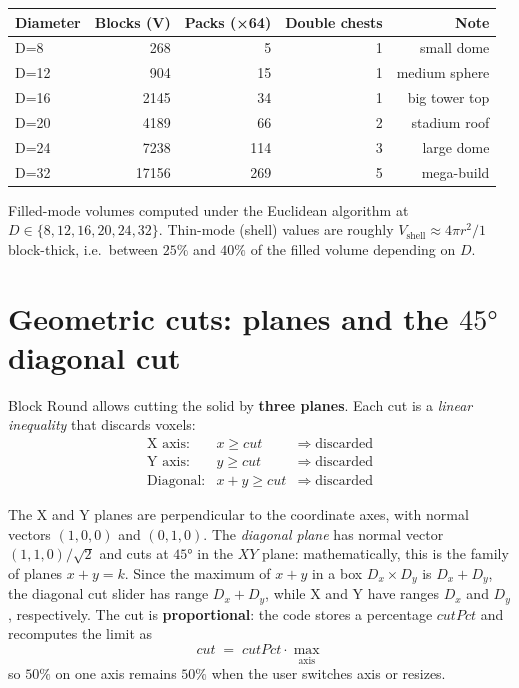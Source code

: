 \documentclass[12pt,a4paper]{scrartcl}
\newcommand{\acc}[1]{\textcolor{accent}{\textbf{#1}}}
\begin{document}
\vspace{0.5em}
\begin{center}
\begin{tabular}{@{}lrrrr@{}}
\toprule
\textbf{Diameter} & \textbf{Blocks (V)} & \textbf{Packs (×64)} & \textbf{Double chests} & \textbf{Note} \\
\midrule
D=8   &   268 &  5  & 1 & small dome  \\
D=12  &   904 & 15  & 1 & medium sphere \\
D=16  &  2145 & 34  & 1 & big tower top \\
D=20  &  4189 & 66  & 2 & stadium roof \\
D=24  &  7238 & 114 & 3 & large dome \\
D=32  & 17156 & 269 & 5 & mega-build \\
\bottomrule
\end{tabular}
\end{center}

Filled-mode volumes computed under the Euclidean algorithm at $D \in \{8,12,16,20,24,32\}$. Thin-mode (shell) values are roughly $V_{\mathrm{shell}} \approx 4\pi r^2 / 1$ block-thick, i.e.\ between $25\%$ and $40\%$ of the filled volume depending on $D$.

\section{Geometric cuts: planes and the $45°$ diagonal cut}

Block Round allows cutting the solid by \acc{three planes}. Each cut is a \emph{linear inequality} that discards voxels:
\[
\begin{array}{lcl}
\text{X axis:}    & x \geq \mathit{cut}      & \Rightarrow\; \text{discarded} \\
\text{Y axis:}    & y \geq \mathit{cut}      & \Rightarrow\; \text{discarded} \\
\text{Diagonal:}  & x + y \geq \mathit{cut}  & \Rightarrow\; \text{discarded}
\end{array}
\]

The X and Y planes are perpendicular to the coordinate axes, with normal vectors $(1,0,0)$ and $(0,1,0)$. The \emph{diagonal plane} has normal vector $(1,1,0)/\sqrt{2}$ and cuts at $45°$ in the $XY$ plane: mathematically, this is the family of planes $x+y = k$. Since the maximum of $x+y$ in a box $D_x \times D_y$ is $D_x + D_y$, the diagonal cut slider has range $D_x + D_y$, while X and Y have ranges $D_x$ and $D_y$, respectively. The cut is \acc{proportional}: the code stores a percentage $\mathit{cutPct}$ and recomputes the limit as
\[
\mathit{cut} \;=\; \mathit{cutPct} \cdot \max_{\text{axis}}
\]
so $50\%$ on one axis remains $50\%$ when the user switches axis or resizes.
\end{document}
